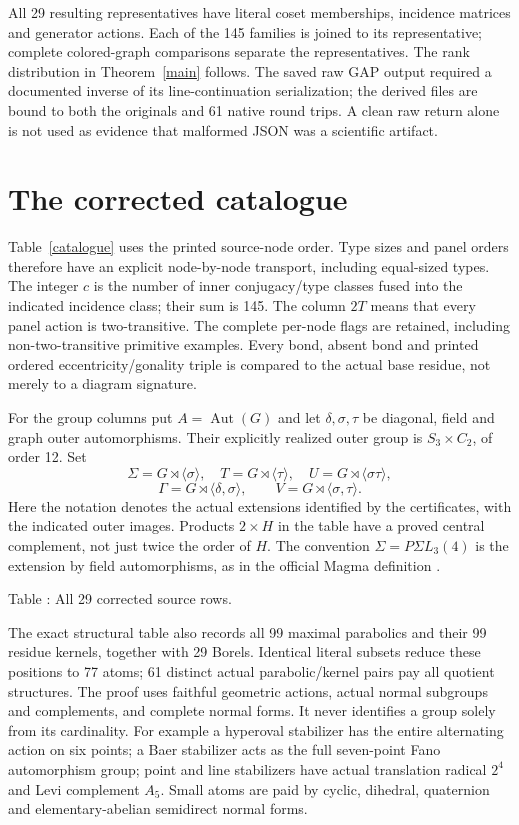 \documentclass[11pt]{article}
\newcommand{\Aut}{\operatorname{Aut}}\newcommand{\Cor}{\operatorname{Cor}}
\begin{document}
All 29 resulting representatives have literal coset memberships,
incidence matrices and generator actions. Each of the 145 families is
joined to its representative; complete colored-graph comparisons
separate the representatives. The rank distribution in Theorem~\ref{main}
follows. The saved raw GAP output required a documented inverse of its
line-continuation serialization; the derived files are bound to both
the originals and 61 native round trips. A clean raw return alone is
not used as evidence that malformed JSON was a scientific artifact.

\section{The corrected catalogue}\label{catalogue-section}
Table~\ref{catalogue} uses the printed source-node order. Type sizes
and panel orders therefore have an explicit node-by-node transport,
including equal-sized types. The integer $c$ is the number of inner
conjugacy/type classes fused into the indicated incidence class;
their sum is 145. The column $2T$ means that every panel action is
two-transitive. The complete per-node flags are retained, including
non-two-transitive primitive examples. Every bond, absent bond and
printed ordered eccentricity/gonality triple is compared to the actual
base residue, not merely to a diagram signature.

For the group columns put $A=\Aut(G)$ and let $\delta,\sigma,\tau$
be diagonal, field and graph outer automorphisms. Their explicitly
realized outer group is $S_3\times C_2$, of order 12. Set
\[
 \Sigma=G\rtimes\langle\sigma\rangle,\quad
 T=G\rtimes\langle\tau\rangle,\quad
 U=G\rtimes\langle\sigma\tau\rangle,
\]
\[
 \Gamma=G\rtimes\langle\delta,\sigma\rangle,\qquad
 V=G\rtimes\langle\sigma,\tau\rangle.
\]
Here the notation denotes the actual extensions identified by the
certificates, with the indicated outer images. Products $2\times H$
in the table have a proved central complement, not just twice the
order of $H$. The convention $\Sigma=P\Sigma L_3(4)$ is the extension
by field automorphisms, as in the official Magma definition \cite{Magma}.

\begin{center}\small
{}\label{catalogue}
Table \thetable: All 29 corrected source rows.

\end{center}

The exact structural table also records all 99 maximal parabolics and
their 99 residue kernels, together with 29 Borels. Identical literal
subsets reduce these positions to 77 atoms; 61 distinct actual
parabolic/kernel pairs pay all quotient structures. The proof
\cite{Structure} uses faithful geometric actions, actual normal
subgroups and complements, and complete normal forms. It never
identifies a group solely from its cardinality. For example a
hyperoval stabilizer has the entire alternating action on six points;
a Baer stabilizer acts as the full seven-point Fano automorphism group;
point and line stabilizers have actual translation radical $2^4$ and
Levi complement $A_5$. Small atoms are paid by cyclic, dihedral,
quaternion and elementary-abelian semidirect normal forms.
\end{document}
